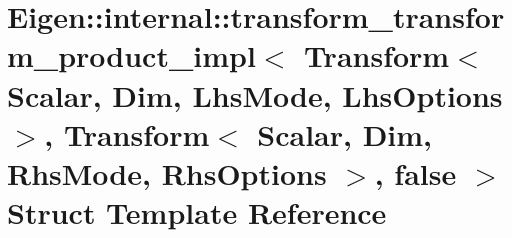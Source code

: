 \hypertarget{struct_eigen_1_1internal_1_1transform__transform__product__impl_3_01_transform_3_01_scalar_00_01fe1fb77c9f6edc527bf418dd10ef65b9}{}\section{Eigen\+:\+:internal\+:\+:transform\+\_\+transform\+\_\+product\+\_\+impl$<$ Transform$<$ Scalar, Dim, Lhs\+Mode, Lhs\+Options $>$, Transform$<$ Scalar, Dim, Rhs\+Mode, Rhs\+Options $>$, false $>$ Struct Template Reference}
\label{struct_eigen_1_1internal_1_1transform__transform__product__impl_3_01_transform_3_01_scalar_00_01fe1fb77c9f6edc527bf418dd10ef65b9}
